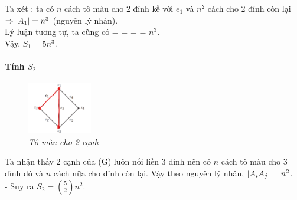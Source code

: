 \documentclass[main.tex]{subfiles}
\begin{document}
Ta xét : ta có $n$ cách tô màu cho 2 đỉnh kề với $e_1$ và $n^2$ cách cho 2 đỉnh còn lại $\Rightarrow \left|A_{1}\right| = n^3$ (nguyên lý nhân).\\
Lý luận tương tự, ta cũng có  =  =  =  = $n^3$.\\ 
Vậy, $S_1 = 5n^3$.\\ 

\paragraph*{Tính $S_2$}
\begin{figure}
\centering
\vspace*{-1cm}
\includegraphics[width=0.25\textwidth]{image/Bai6_S2.png}
\captionsetup{labelformat=empty}
\caption{\textit{Tô màu cho 2 cạnh}}
\vspace*{-1cm}

\end{figure}

Ta nhận thấy 2 cạnh của (G) luôn nối liền 3 đỉnh nên có $n$ cách tô màu cho 3 đỉnh đó và $n$ cách nữa cho đỉnh còn lại. Vậy theo nguyên lý nhân, $\left|A_iA_j\right|=n^2$.\\
- Suy ra $S_2 = {5 \choose 2} n^2$. \\
\end{document}
